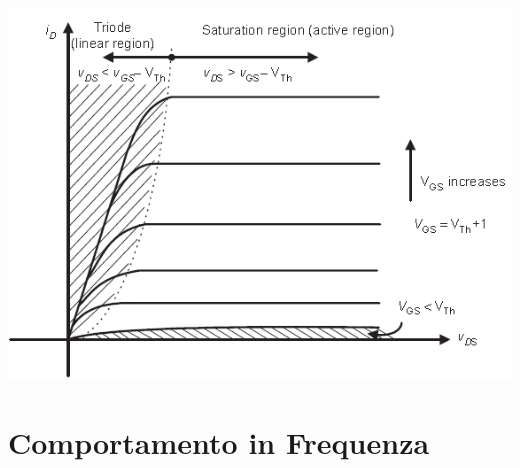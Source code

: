 \documentclass{article}
\begin{document}
\begin{center}
    \includegraphics{image.png}
\end{center}

\newpage

\section{Comportamento in Frequenza}
\end{document}
